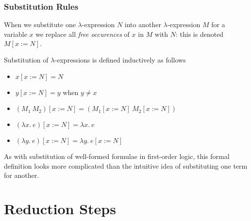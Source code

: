 \documentclass{beamer}
\begin{document}
\begin{frame}
	\frametitle{Substitution Rules}
	
	When we substitute one $\lambda$-expression $N$ into another $\lambda$-expression $M$ for a variable $x$ we replace all \emph{free occurences} of $x$ in $M$ with $N$: this is denoted $M[x:=N]$. 

	\vspace{0.2cm}

	Substitution of $\lambda$-expressions is defined inductively as follows

	\vspace{0.2cm}

	\begin{itemize}
		\item[] $x[x:=N] = N$ \vspace{0.2cm}
		\item[] $y[x:=N] = y$ when $y \neq x$ \vspace{0.2cm}
		\item[] $(M_{1} \ M_{2})[x:=N] = (M_{1}[x:=N] \ M_{2}[x:=N])$ \vspace{0.2cm}
		\item[] $(\lambda x. \ e)[x:=N] = \lambda x. \ e$ \vspace{0.2cm}
		\item[] $(\lambda y. \ e)[x:=N] = \lambda y. \ e[x:=N]$
	\end{itemize}

	As with substitution of well-formed formulae in first-order logic, this formal definition looks more complicated than the intuitive idea of substituting one term for another. 
	
\end{frame}

\section{Reduction Steps}
\end{document}

